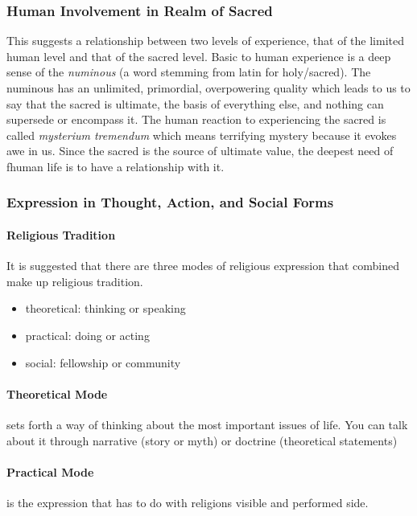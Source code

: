 \documentclass{article}
\begin{document}
\subsubsection{Human Involvement in Realm of Sacred}
\label{ssub:human_involvement_in_relm_of_sacred}
This suggests a relationship between two levels of experience, that of the limited human level and that of the sacred level. Basic to human experience is a deep sense of the \emph{numinous} (a word stemming from latin for holy/sacred). The numinous has an unlimited, primordial, overpowering quality which leads to us to say that the sacred is ultimate, the basis of everything else, and nothing can supersede or encompass it. The human reaction to experiencing the sacred is called \emph{mysterium tremendum} which means terrifying mystery because it evokes awe in us. Since the sacred is the source of ultimate value, the deepest need of fhuman life is to have a relationship with it.

\subsubsection{Expression in Thought, Action, and Social Forms}
\label{ssub:expression_in_thought_action_and_social_forms}
\paragraph{Religious Tradition}
\label{par:religious_tradition}
It is suggested that there are three modes of religious expression that combined make up religious tradition.
\begin{itemize}
	\item theoretical: thinking or speaking
	\item practical: doing or acting
	\item social: fellowship or community
\end{itemize}

\paragraph{Theoretical Mode}
\label{par:theoretical_mode}
sets forth a way of thinking about the most important issues of life. You can talk about it through narrative (story or myth) or doctrine (theoretical  statements)

\paragraph{Practical Mode}
\label{par:practical_mode}
is the expression that has to do with religions visible and performed side.
\end{document}
